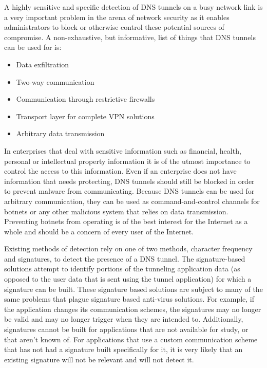 \documentclass{article}
\theoremstyle{remark}
\theoremstyle{definition}
\theoremstyle{definition}
\theoremstyle{definition}
\begin{document}
A highly sensitive and specific detection of DNS tunnels on a busy network link
is a very important problem in the arena of network security as it enables
administrators to block or otherwise control these potential sources of
compromise. A non-exhaustive, but informative, list of things that DNS tunnels
can be used for is:

\begin{itemize}
\item Data exfiltration
\item Two-way communication
\item Communication through restrictive firewalls
\item Transport layer for complete VPN solutions
\item Arbitrary data transmission
\end{itemize}

In enterprises that deal with sensitive information such as financial, health,
personal or intellectual property information it is of the utmost importance to
control the access to this information. Even if an enterprise does not have
information that needs protecting, DNS tunnels should still be blocked in order
to prevent malware from communicating. Because DNS tunnels can be used for
arbitrary communication, they can be used as command-and-control channels for
botnets or any other malicious system that relies on data transmission. Preventing
botnets from operating is of the best interest for the Internet as a whole and
should be a concern of every user of the Internet.

Existing methods of detection rely on one of two methods, character frequency
and signatures, to detect the presence of a DNS tunnel. The signature-based solutions attempt to identify portions of the tunneling
application data (as opposed to the user data that is sent using the tunnel
application) for which a signature can be built. These signature based
solutions are subject to many of the same problems that plague signature based
anti-virus solutions. For example, if the application changes its communication
schemes, the signatures may no longer be valid and may no longer trigger when
they are intended to. Additionally, signatures cannot be built for applications
that are not available for study, or that aren't known of. For applications
that use a custom communication scheme that has not had a signature built
specifically for it, it is very likely that an existing signature will not be
relevant and will not detect it.
\end{document}
